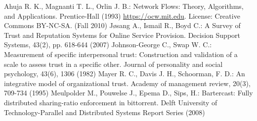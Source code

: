 \begin{thebibliography}{40}
   Ahuja R. K., Magnanti T. L., Orlin J. B.: Network Flows: Theory, Algorithms, and Applications. Prentice-Hall (1993)
   \url{https://ocw.mit.edu}. License: Creative Commons BY-NC-SA. (Fall 2010)
   J\o{}sang A., Ismail R., Boyd C.: A Survey of Trust and Reputation Systems for Online Service Provision. Decision
   Support Systems, 43(2), pp. 618-644 (2007)
   Johnson-George C., Swap W. C.: Measurement of specific interpersonal trust: Construction and validation of a scale to
   assess trust in a specific other. Journal of personality and social psychology, 43(6), 1306 (1982)
   Mayer R. C., Davis J. H., Schoorman, F. D.: An integrative model of organizational trust. Academy of management review,
   20(3), 709-734 (1995)
   Meulpolder M., Pouwelse J., Epema D., Sips, H.: Bartercast: Fully distributed sharing-ratio enforcement in bittorrent.
   Delft University of Technology-Parallel and Distributed Systems Report Series (2008)
\end{thebibliography}

